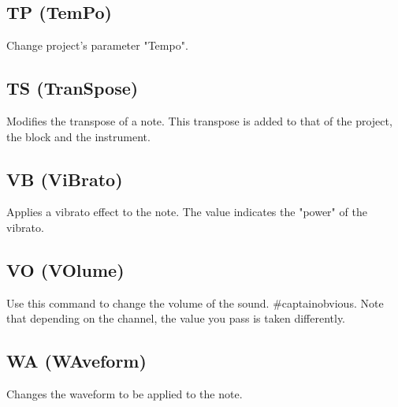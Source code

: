 \subsection{TP (TemPo)}

Change project's parameter "Tempo".

\subsection{TS (TranSpose)}


Modifies the transpose of a note. This transpose is added to that of the project, the block and the instrument.

\subsection{VB (ViBrato)}


Applies a vibrato effect to the note. The value indicates the "power" of the vibrato.

\subsection{VO (VOlume)}

Use this command to change the volume of the sound.
\#captainobvious.
Note that depending on the channel, the value you pass is taken differently.

\subsection{WA (WAveform)}


Changes the waveform to be applied to the note.
